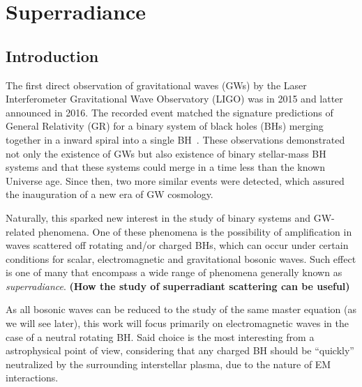 
\chapter{Superradiance} %
\label{Chapter1}


\section{Introduction}

The first direct observation of gravitational waves (GWs) by the Laser Interferometer Gravitational Wave Observatory (LIGO) was in 2015 and latter announced in 2016.
The recorded event matched the signature predictions of General Relativity (GR) for a binary system of black holes (BHs) merging together in a inward spiral into a single BH~\cite{Abbott2016}.
These observations demonstrated not only the existence of GWs but also existence of binary stellar-mass BH systems and that these systems could merge in a time less than the known Universe age.
Since then, two more similar events were detected, which assured the inauguration of a new era of GW cosmology. 

Naturally, this sparked new interest in the study of binary systems and GW-related phenomena.
One of these phenomena is the possibility of amplification in waves scattered off rotating and/or charged BHs, which can occur under certain conditions for scalar, electromagnetic and gravitational bosonic waves.
Such effect is one of many that encompass a wide range of phenomena generally known as \emph{superradiance}. \textbf{(How the study of superradiant scattering can be useful)}

As all bosonic waves can be reduced to the study of the same master equation (as we will see later), this work will focus primarily on electromagnetic waves in the case of a neutral rotating BH.
Said choice is the most interesting from a astrophysical point of view, considering that any charged BH should be ``quickly'' neutralized by the surrounding interstellar plasma, due to the nature of EM interactions.

